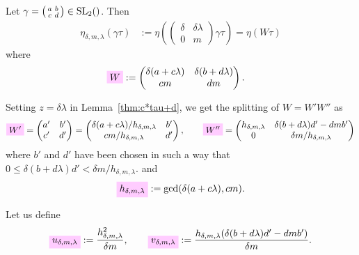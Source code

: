 \documentclass{article}
\begin{document}
Let
$\gamma=\left(\begin{smallmatrix}a&b\\c&d\end{smallmatrix}\right) \in
\SL2Z$.
%
Then
\begin{align}
  \eta_{\delta,m,\lambda}(\gamma \tau)
  &:= \eta
\left(
  \begin{pmatrix}\delta& \delta \lambda\\0&m\end{pmatrix}
  \gamma
  \tau
\right)
=
\eta(W \tau)
\end{align}
where
\begin{align}
  \defineNotation[W]{W}
  &:=
  \begin{pmatrix}
    \delta (a + c \lambda) & \delta (b + d \lambda)\\
    c m                   & d m
  \end{pmatrix}.
  \label{eq:W_delta-m-lambda}
\end{align}

Setting $z = \delta \lambda$ in Lemma~\ref{thm:c*tau+d}, we get the
splitting of $W = W' W''$ as
%
\begin{gather}
  \defineNotation[W']{W'}
  =
  \begin{pmatrix}
    a' & b'\\
    c' & d'
  \end{pmatrix}
  = \begin{pmatrix}
      \delta(a+c \lambda)/h_{\delta,m,\lambda} & b'\\
      cm/h_{\delta,m,\lambda}                  & d'
    \end{pmatrix},
  \qquad
  \defineNotation[W'']{W''}
  =
  \begin{pmatrix}
    h_{\delta,m,\lambda} & \delta (b + d \lambda) d' - d m b'\\
    0               & \delta m / h_{\delta,m,\lambda}
  \end{pmatrix}
  \label{eq:split-W_delta-m-lambda}
\end{gather}
where $b'$ and $d'$ have been chosen in such a way that
$0\le  \delta (b + d \lambda) d' < \delta m / h_{\delta,m,\lambda}$.
and
\begin{gather}
  \defineNotation[h-delta-m-lambda]{h_{\delta,m,\lambda}} :=
  \gcd(\delta (a + c \lambda), cm).
\end{gather}

Let us define
\begin{gather}
  \defineNotation[u-delta-m-lambda]{u_{\delta,m,\lambda}}
  :=
  \frac{h_{\delta,m,\lambda}^2}{\delta m},
  \qquad
  \defineNotation[v-delta-m-lambda]{v_{\delta,m,\lambda}}
  :=
  \frac{h_{\delta,m,\lambda}(\delta (b + d \lambda) d' - d m b')}{\delta m}.
  \label{eq:uv_delta-m-lambda}
\end{gather}
\end{document}
